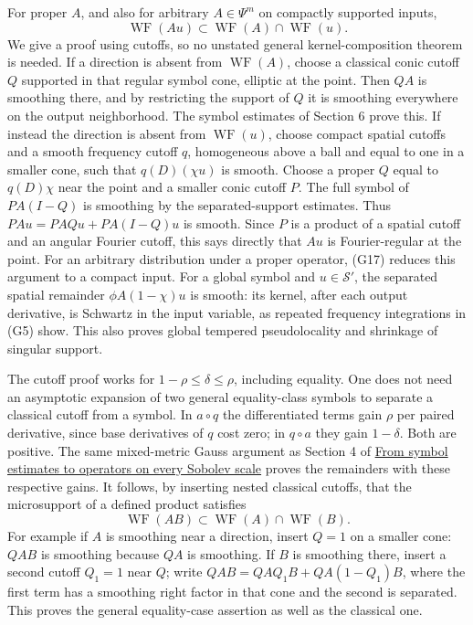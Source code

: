 \documentclass[
  11pt,
]{article}
\begin{document}
For proper \(A\), and also for arbitrary \(A\in\Psi^m\) on compactly
supported inputs, \[
\operatorname{WF}(Au)\subset\operatorname{WF}(A)\cap\operatorname{WF}(u).
\tag{G24}
\] We give a proof using cutoffs, so no unstated general
kernel-composition theorem is needed. If a direction is absent from
\(\operatorname{WF}(A)\), choose a classical conic cutoff \(Q\)
supported in that regular symbol cone, elliptic at the point. Then
\(QA\) is smoothing there, and by restricting the support of \(Q\) it is
smoothing everywhere on the output neighborhood. The symbol estimates of
Section 6 prove this. If instead the direction is absent from
\(\operatorname{WF}(u)\), choose compact spatial cutoffs and a smooth
frequency cutoff \(q\), homogeneous above a ball and equal to one in a
smaller cone, such that \(q(D)(\chi u)\) is smooth. Choose a proper
\(Q\) equal to \(q(D)\chi\) near the point and a smaller conic cutoff
\(P\). The full symbol of \(PA(I-Q)\) is smoothing by the
separated-support estimates. Thus \(PAu=PAQu+PA(I-Q)u\) is smooth. Since
\(P\) is a product of a spatial cutoff and an angular Fourier cutoff,
this says directly that \(Au\) is Fourier-regular at the point. For an
arbitrary distribution under a proper operator, (G17) reduces this
argument to a compact input. For a global symbol and
\(u\in\mathcal S'\), the separated spatial remainder \(\phi A(1-\chi)u\)
is smooth: its kernel, after each output derivative, is Schwartz in the
input variable, as repeated frequency integrations in (G5) show. This
also proves global tempered pseudolocality and shrinkage of singular
support.

The cutoff proof works for \(1-\rho\leq\delta\leq\rho\), including
equality. One does not need an asymptotic expansion of two general
equality-class symbols to separate a classical cutoff from a symbol. In
\(a\circ q\) the differentiated terms gain \(\rho\) per paired
derivative, since base derivatives of \(q\) cost zero; in \(q\circ a\)
they gain \(1-\delta\). Both are positive. The same mixed-metric Gauss
argument as Section 4 of \href{euclidean-symbol-calculus.pdf}{From symbol
estimates to operators on every Sobolev scale} proves the remainders
with these respective gains. It follows, by inserting nested classical
cutoffs, that the microsupport of a defined product satisfies \[
\operatorname{WF}(AB)\subset\operatorname{WF}(A)\cap\operatorname{WF}(B).
\tag{G25}
\] For example if \(A\) is smoothing near a direction, insert \(Q=1\) on
a smaller cone: \(QAB\) is smoothing because \(QA\) is smoothing. If
\(B\) is smoothing there, insert a second cutoff \(Q_1=1\) near \(Q\);
write \(QAB=QAQ_1B+QA(1-Q_1)B\), where the first term has a smoothing
right factor in that cone and the second is separated. This proves the
general equality-case assertion as well as the classical one.
\end{document}
